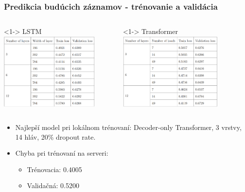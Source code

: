 \documentclass[slovak,10pt]{beamer}
\begin{document}
\begin{frame}
	\frametitle{Predikcia budúcich záznamov - trénovanie a validácia}
	
	\begin{columns}[T]%
		\begin{column}{.42\textwidth}<1->%
			LSTM
			\includegraphics[height=3.85cm]{images/train_LSTM.png}
		\end{column}
		\hfill%
		\begin{column}{.49\textwidth}<1->%
			Transformer
			\includegraphics[height=3.85cm]{images/train_Trans.png}
		\end{column}  
	\end{columns}
	\begin{itemize}
		\item<1> Najlepší model pri lokálnom trénovaní: Decoder-only Transformer, 3 vrstvy, 14 hláv, 20\% dropout rate.
		\item<1> Chyba pri trénovaní na serveri: 
		\begin{itemize}
			\item<1> Trénovacia: 0.4005
			\item<1> Validačná: 0.5200
		\end{itemize}
	\end{itemize}
\end{frame}
\end{document}
